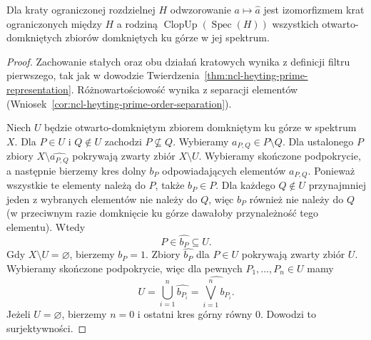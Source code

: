 \begin{twierdzenie}
\label{thm:ncl-heyting-priestley-representation}
Dla kraty ograniczonej rozdzielnej $H$ odwzorowanie
$a\mapsto\widehat a$ jest izomorfizmem krat
ograniczonych między $H$ a rodziną
$\operatorname{ClopUp}(\operatorname{Spec}(H))$
wszystkich otwarto-domkniętych zbiorów domkniętych
ku górze w jej spektrum.
\end{twierdzenie}
\begin{proof}
Zachowanie stałych oraz obu działań kratowych
wynika z definicji filtru pierwszego, tak jak
w dowodzie
Twierdzenia~\ref{thm:ncl-heyting-prime-representation}.
Różnowartościowość wynika z separacji elementów
(Wniosek~\ref{cor:ncl-heyting-prime-order-separation}).

Niech $U$ będzie otwarto-domkniętym zbiorem
domkniętym ku górze w spektrum $X$.
Dla $P\in U$ i $Q\notin U$ zachodzi
$P\not\subseteq Q$. Wybieramy $a_{P,Q}\in P\setminus Q$.
Dla ustalonego $P$ zbiory
$X\setminus\widehat{a_{P,Q}}$ pokrywają
zwarty zbiór $X\setminus U$.
Wybieramy skończone podpokrycie, a następnie
bierzemy kres dolny $b_P$ odpowiadających
elementów $a_{P,Q}$. Ponieważ wszystkie te
elementy należą do $P$, także $b_P\in P$.
Dla każdego $Q\notin U$ przynajmniej jeden z
wybranych elementów nie należy do $Q$,
więc $b_P$ również nie należy do $Q$ (w przeciwnym
razie domknięcie ku górze dawałoby przynależność
tego elementu). Wtedy
\[
 P\in\widehat{b_P}\subseteq U.
\]
Gdy $X\setminus U=\varnothing$, bierzemy $b_P=1$.
Zbiory $\widehat{b_P}$ dla $P\in U$ pokrywają
zwarty zbiór $U$. Wybieramy skończone podpokrycie,
więc dla pewnych $P_1,\ldots,P_n\in U$ mamy
\[
 U=\bigcup_{i=1}^n\widehat{b_{P_i}}
  =\widehat{\bigvee_{i=1}^n b_{P_i}}.
\]
Jeżeli $U=\varnothing$, bierzemy $n=0$
i ostatni kres górny równy $0$.
Dowodzi to surjektywności.
\end{proof}

